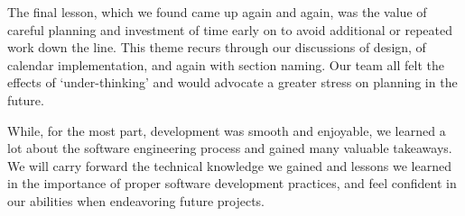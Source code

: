 \documentclass{l3proj}
\begin{document}
The final lesson, which we found came up again and again, was the value of careful planning and investment of time early on to avoid additional or repeated work down the line. This theme recurs through our discussions of design, of calendar implementation, and again with section naming. Our team all felt the effects of `under-thinking' and would advocate a greater stress on planning in the future. 

While, for the most part, development was smooth and enjoyable, we learned a lot about the software engineering process and gained many valuable takeaways. We will carry forward the technical knowledge we gained and lessons we learned in the importance of proper software development practices, and feel confident in our abilities when endeavoring future projects. 


\newpage


\end{document}
